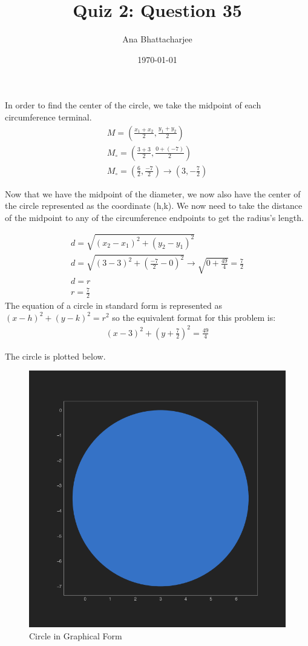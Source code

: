 \documentclass{article}
\begin{document}
\author{Ana Bhattacharjee}
\title{Quiz 2: Question 35}
\date{\today}
\maketitle{}

\begin{center}
In order to find the center of the circle, we take the midpoint of each circumference terminal.
\begin{align}
M = (\frac{x_1 + x_2}{2}, \frac{y_1 + y_2}{2}) \\
M_{\circ} = (\frac{3 + 3}{2}, \frac{0 + (-7)}{2}) \\
M_{\circ} = (\frac{6}{2}, \frac{-7}{2}) \rightarrow (3, -\frac{7}{2})
\end{align}

Now that we have the midpoint of the diameter, we now also have the center of the circle represented as the coordinate (h,k). We now need to take the distance of the midpoint to any of the circumference endpoints to get the radius's length.
\par
\begin{align}
  d = \sqrt{(x_2 - x_1)^2 + (y_2 - y_1)^2} \\
  d = \sqrt{(3 - 3)^2 + (\frac{-7}{2} - 0)^2} \rightarrow \sqrt{0 + \frac{49}{4}} = \frac{7}{2} \\
  d = r \\
  r = \frac{7}{2}
\end{align}
The equation of a circle in standard form is represented as $ (x - h)^2 + (y - k)^2 = r^2 $ so the equivalent format for this problem is:
\begin{align}
  (x - 3)^2 + (y + \frac{7}{2})^2 = \frac{49}{4}
\end{align}
\par
The circle is plotted below.
\begin{figure}[!htbp]
  \includegraphics[width=1\columnwidth]{../q35/circle}
  \caption{Circle in Graphical Form}
\end{figure}
\end{center}
\end{document}
